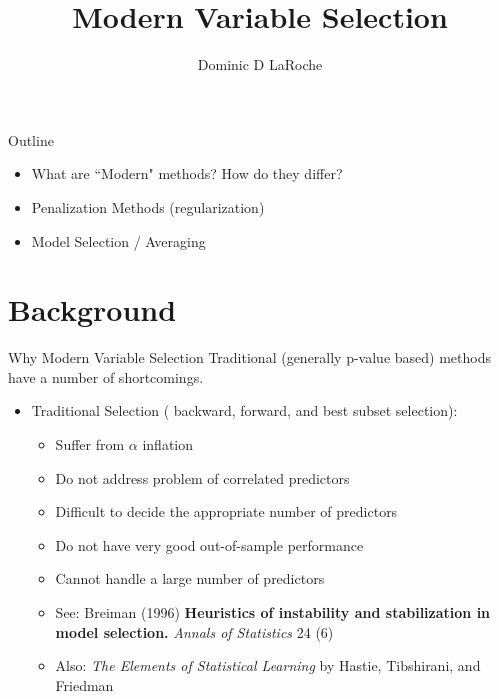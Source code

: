 \documentclass{beamer}\usepackage[]{graphicx}\usepackage[]{color}
\title{Modern Variable Selection}
\author{Dominic D LaRoche}
\begin{document}
\maketitle

\begin{frame}{Outline}
\begin{itemize}
\item What are ``Modern" methods?  How do they differ?
\bigskip
\item Penalization Methods (regularization)
\bigskip
\item Model Selection / Averaging
\end{itemize}
\end{frame}

\section{Background}

\begin{frame}{Why Modern Variable Selection}
Traditional (generally p-value based) methods have a number of shortcomings.
\begin{itemize}
\item Traditional Selection ( backward, forward, and best subset selection):
  \begin{itemize}
  \item Suffer from $\alpha$ inflation
  \item Do not address problem of correlated predictors
  \item Difficult to decide the appropriate number of predictors
  \item Do not have very good out-of-sample performance
  \item Cannot handle a large number of predictors
  \item See: Breiman (1996) \textbf{Heuristics of instability and stabilization in model selection.} \emph{Annals of Statistics} 24 (6)
  \item Also: \emph{The Elements of Statistical Learning} by Hastie, Tibshirani, and Friedman
  \end{itemize}
\end{itemize}
\end{frame}
\end{document}
